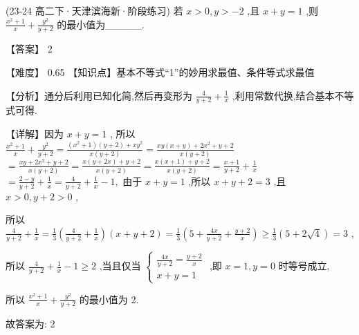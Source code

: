 \documentclass[11pt,a4paper]{article}
\begin{document}
\begin{hmwk} 
 (23-24 高二下·天津滨海新·阶段练习) 若 \(\displaystyle x > 0,y >  - 2\) ,且 \(\displaystyle x + y = 1\) ,则 \(\displaystyle \frac{{x}^{2} + 1}{x} + \frac{{y}^{2}}{y + 2}\) 的最小值为\_\_\_\_\_. 
 
 \begin{jiexi}
【答案】 2 

【难度】 0.65 【知识点】基本不等式“1”的妙用求最值、条件等式求最值 

【分析】通分后利用已知化简,然后再变形为 \(\displaystyle \frac{4}{y + 2} + \frac{1}{x}\) ,利用常数代换,结合基本不等式可得. 

【详解】因为 \(\displaystyle x + y = 1\) , 所以 \(\displaystyle \frac{{x}^{2} + 1}{x} + \frac{{y}^{2}}{y + 2} = \frac{\left( {{x}^{2} + 1}\right) \left( {y + 2}\right)  + x{y}^{2}}{x\left( {y + 2}\right) } = \frac{{xy}\left( {x + y}\right)  + 2{x}^{2} + y + 2}{x\left( {y + 2}\right) }\)  \(\displaystyle = \frac{{xy} + 2{x}^{2} + y + 2}{x\left( {y + 2}\right) } = \frac{x\left( {y + {2x}}\right)  + y + 2}{x\left( {y + 2}\right) } = \frac{x\left( {x + 1}\right)  + y + 2}{x\left( {y + 2}\right) } = \frac{x + 1}{y + 2} + \frac{1}{x}\)  \(\displaystyle = \frac{2 - y}{y + 2} + \frac{1}{x} = \frac{4}{y + 2} + \frac{1}{x} - 1,\) 由于 \(\displaystyle x + y = 1\) ,所以 \(\displaystyle x + y + 2 = 3\) ,且 \(\displaystyle x > 0,y + 2 > 0\) ,

所以 \(\displaystyle \frac{4}{y + 2} + \frac{1}{x} = \frac{1}{3}\left( {\frac{4}{y + 2} + \frac{1}{x}}\right) \left( {x + y + 2}\right)  = \frac{1}{3}\left( {5 + \frac{4x}{y + 2} + \frac{y + 2}{x}}\right)  \geq  \frac{1}{3}\left( {5 + 2\sqrt{4}}\right)  = 3\) ,

所以 \(\displaystyle \frac{4}{y + 2} + \frac{1}{x} - 1 \geq  2\) ,当且仅当 \(\displaystyle \left\{  \begin{array}{l} \frac{4x}{y + 2} = \frac{y + 2}{x} \\  x + y = 1 \end{array}\right.\) ,即 \(\displaystyle x = 1,y = 0\) 时等号成立,

所以 \(\displaystyle \frac{{x}^{2} + 1}{x} + \frac{{y}^{2}}{y + 2}\) 的最小值为 2.

故答案为: 2

\end{jiexi}
\end{hmwk}
\end{document}
